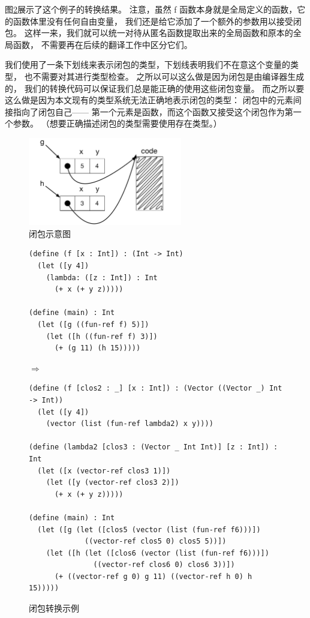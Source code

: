 图\ref{fig:colure-conversion-eg}展示了这个例子的转换结果。
注意，虽然 f 函数本身就是全局定义的函数，它的函数体里没有任何自由变量，
我们还是给它添加了一个额外的参数用以接受闭包。
这样一来，我们就可以统一对待从匿名函数提取出来的全局函数和原本的全局函数，
不需要再在后续的翻译工作中区分它们。

我们使用了一条下划线来表示闭包的类型，下划线表明我们不在意这个变量的类型，
也不需要对其进行类型检查。
之所以可以这么做是因为闭包是由编译器生成的，
我们的转换代码可以保证我们总是能正确的使用这些闭包变量。
而之所以要这么做是因为本文现有的类型系统无法正确地表示闭包的类型：
闭包中的元素间接指向了闭包自己——
第一个元素是函数，而这个函数又接受这个闭包作为第一个参数。
（想要正确描述闭包的类型需要使用存在类型\cite{Minamide_Morrisett_Harper_1996}。）

\begin{figure}[t]
\centering \includegraphics[width=0.6\textwidth]{figures/closures}
\caption{闭包示意图}
\label{fig:closure-eg}
\end{figure}

\begin{figure}[tbp]
  \begin{minipage}{0.8\textwidth}
\begin{lstlisting}[basicstyle=\ttfamily\footnotesize]
(define (f [x : Int]) : (Int -> Int)
  (let ([y 4])
    (lambda: ([z : Int]) : Int
      (+ x (+ y z)))))

(define (main) : Int
  (let ([g ((fun-ref f) 5)])
    (let ([h ((fun-ref f) 3)])
      (+ (g 11) (h 15)))))
\end{lstlisting}
$\Rightarrow$
\begin{lstlisting}[basicstyle=\ttfamily\footnotesize]
(define (f [clos2 : _] [x : Int]) : (Vector ((Vector _) Int -> Int))
  (let ([y 4])
    (vector (list (fun-ref lambda2) x y))))

(define (lambda2 [clos3 : (Vector _ Int Int)] [z : Int]) : Int
  (let ([x (vector-ref clos3 1)])
    (let ([y (vector-ref clos3 2)])
      (+ x (+ y z)))))

(define (main) : Int
  (let ([g (let ([clos5 (vector (list (fun-ref f6)))])
             ((vector-ref clos5 0) clos5 5))])
    (let ([h (let ([clos6 (vector (list (fun-ref f6)))])
               ((vector-ref clos6 0) clos6 3))])
      (+ ((vector-ref g 0) g 11) ((vector-ref h 0) h 15)))))
\end{lstlisting}
\end{minipage}

\caption{闭包转换示例}
\label{fig:colure-conversion-eg}
\end{figure}


